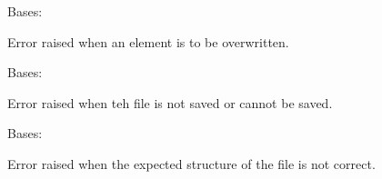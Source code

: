 \documentclass[letterpaper,10pt,english]{sphinxmanual}
\begin{document}

\begin{fulllineitems}
\label{\detokenize{source/_autosummary/HDF5_BLS.errors:HDF5_BLS.errors.WrapperError_Overwrite}}
\pysigstartsignatures
\pysiglinewithargsret
{}
{}
{}
\pysigstopsignatures
\sphinxAtStartPar
Bases: {\hyperref[\detokenize{source/_autosummary/HDF5_BLS.errors:HDF5_BLS.errors.WrapperError}]{}}

\sphinxAtStartPar
Error raised when an element is to be overwritten.

\end{fulllineitems}


\begin{fulllineitems}
\label{\detokenize{source/_autosummary/HDF5_BLS.errors:HDF5_BLS.errors.WrapperError_Save}}
\pysigstartsignatures
\pysiglinewithargsret
{}
{}
{}
\pysigstopsignatures
\sphinxAtStartPar
Bases: {\hyperref[\detokenize{source/_autosummary/HDF5_BLS.errors:HDF5_BLS.errors.WrapperError}]{}}

\sphinxAtStartPar
Error raised when teh file is not saved or cannot be saved.

\end{fulllineitems}


\begin{fulllineitems}
\label{\detokenize{source/_autosummary/HDF5_BLS.errors:HDF5_BLS.errors.WrapperError_StructureError}}
\pysigstartsignatures
\pysiglinewithargsret
{}
{}
{}
\pysigstopsignatures
\sphinxAtStartPar
Bases: {\hyperref[\detokenize{source/_autosummary/HDF5_BLS.errors:HDF5_BLS.errors.WrapperError}]{}}

\sphinxAtStartPar
Error raised when the expected structure of the file is not correct.

\end{fulllineitems}
\end{document}
